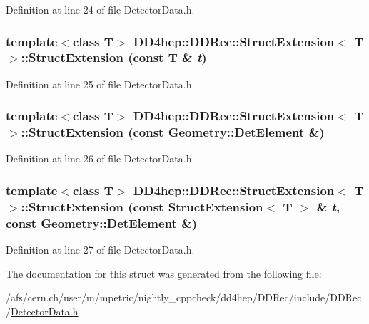 Definition at line 24 of file DetectorData.h.\hypertarget{struct_d_d4hep_1_1_d_d_rec_1_1_struct_extension_a169c4dd3b2b85f44cf5b8ec626fee52a}{
\subsubsection[{StructExtension}]{\setlength{\rightskip}{0pt plus 5cm}template$<$class T$>$ {\bf DD4hep::DDRec::StructExtension}$<$ T $>$::{\bf StructExtension} (const T \& {\em t})}}
\label{struct_d_d4hep_1_1_d_d_rec_1_1_struct_extension_a169c4dd3b2b85f44cf5b8ec626fee52a}


Definition at line 25 of file DetectorData.h.\hypertarget{struct_d_d4hep_1_1_d_d_rec_1_1_struct_extension_ab950293a41316a0603953bc9357bd777}{
\subsubsection[{StructExtension}]{\setlength{\rightskip}{0pt plus 5cm}template$<$class T$>$ {\bf DD4hep::DDRec::StructExtension}$<$ T $>$::{\bf StructExtension} (const {\bf Geometry::DetElement} \&)}}
\label{struct_d_d4hep_1_1_d_d_rec_1_1_struct_extension_ab950293a41316a0603953bc9357bd777}


Definition at line 26 of file DetectorData.h.\hypertarget{struct_d_d4hep_1_1_d_d_rec_1_1_struct_extension_aaf32001dd03ca30024af4a044f8b3169}{
\subsubsection[{StructExtension}]{\setlength{\rightskip}{0pt plus 5cm}template$<$class T$>$ {\bf DD4hep::DDRec::StructExtension}$<$ T $>$::{\bf StructExtension} (const {\bf StructExtension}$<$ T $>$ \& {\em t}, \/  const {\bf Geometry::DetElement} \&)}}
\label{struct_d_d4hep_1_1_d_d_rec_1_1_struct_extension_aaf32001dd03ca30024af4a044f8b3169}


Definition at line 27 of file DetectorData.h.

The documentation for this struct was generated from the following file:\begin{DoxyCompactItemize}
\item 
/afs/cern.ch/user/m/mpetric/nightly\_\-cppcheck/dd4hep/DDRec/include/DDRec/\hyperlink{_detector_data_8h}{DetectorData.h}\end{DoxyCompactItemize}
